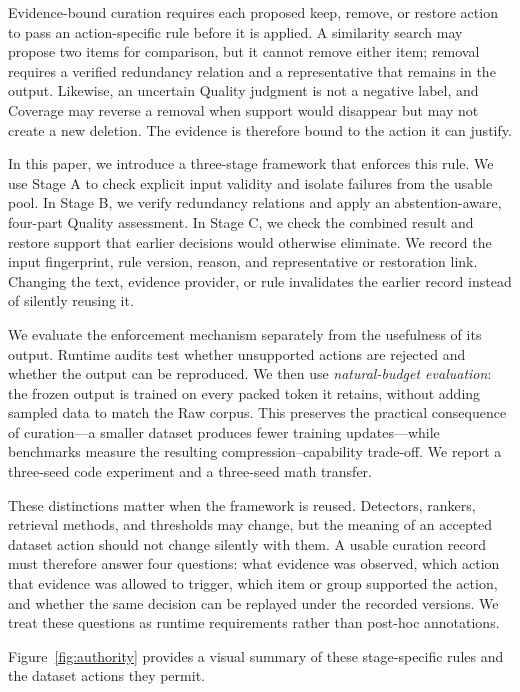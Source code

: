 \documentclass[conference]{IEEEtran}
\begin{document}
Evidence-bound curation requires each proposed keep, remove, or restore action
to pass an action-specific rule before it is applied. A similarity search may
propose two items for comparison, but it cannot remove either item; removal
requires a verified redundancy relation and a representative that remains in
the output. Likewise, an uncertain Quality judgment is not a negative label,
and Coverage may reverse a removal when support would disappear but may not
create a new deletion. The evidence is therefore bound to the action it can
justify.

In this paper, we introduce a three-stage framework that enforces this rule.
We use Stage A to check explicit input validity and isolate failures from the
usable pool. In Stage B, we verify redundancy relations and apply an
abstention-aware, four-part Quality assessment. In Stage C, we check the
combined result and restore support that earlier decisions would otherwise
eliminate. We record the input fingerprint, rule version, reason,
and representative or restoration link. Changing the text, evidence provider,
or rule invalidates the earlier record instead of silently reusing it.

We evaluate the enforcement mechanism separately from the usefulness of its
output. Runtime audits test whether unsupported actions are rejected and whether
the output can be reproduced. We then use \emph{natural-budget evaluation}:
the frozen output is trained on every packed token it retains, without adding
sampled data to match the Raw corpus. This preserves the practical consequence of
curation---a smaller dataset produces fewer training updates---while benchmarks
measure the resulting compression--capability trade-off. We report a
three-seed code experiment and a three-seed math transfer.

These distinctions matter when the framework is reused. Detectors, rankers,
retrieval methods, and thresholds may change, but the meaning of an accepted
dataset action should not change silently with them. A usable curation record
must therefore answer four questions: what evidence was observed, which action
that evidence was allowed to trigger, which item or group supported the action,
and whether the same decision can be replayed under the recorded versions. We
treat these questions as runtime requirements rather than post-hoc annotations.

Figure~\ref{fig:authority} provides a visual summary of these stage-specific
rules and the dataset actions they permit.
\end{document}
